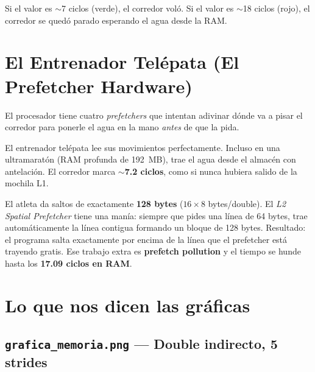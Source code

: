 \documentclass[12pt,a4paper]{article}
\begin{document}
\begin{tcolorbox}[clave, title={Interpretación del resultado}]
Si el valor es $\sim$7 ciclos \textcolor{verde}{(verde)}, el corredor voló. Si el valor es $\sim$18 ciclos \textcolor{rojo}{(rojo)}, el corredor se quedó parado esperando el agua desde la RAM.
\end{tcolorbox}

\section{El Entrenador Telépata (El Prefetcher Hardware)}
\label{sec:prefetcher}

El procesador tiene cuatro \emph{prefetchers} que intentan adivinar dónde va a pisar el corredor para ponerle el agua en la mano \emph{antes} de que la pida.

\begin{tcolorbox}[clave, title={Caso ideal: D=1, corredor predecible}]
El entrenador telépata lee sus movimientos perfectamente. Incluso en una ultramaratón (RAM profunda de 192~MB), trae el agua desde el almacén con antelación. El corredor marca \textbf{$\sim$7.2 ciclos}, como si nunca hubiera salido de la mochila L1.
\end{tcolorbox}

\begin{tcolorbox}[trampa, title={Caso peligroso: D=16, prefetch pollution}]
El atleta da saltos de exactamente \textbf{128 bytes} ($16 \times 8$ bytes/double). El \emph{L2 Spatial Prefetcher} tiene una manía: siempre que pides una línea de 64 bytes, trae automáticamente la línea contigua formando un bloque de 128 bytes. Resultado: el programa salta exactamente por encima de la línea que el prefetcher está trayendo gratis. Ese trabajo extra es \textbf{prefetch pollution} y el tiempo se hunde hasta los \textbf{17.09 ciclos en RAM}.
\end{tcolorbox}

\section{Lo que nos dicen las gráficas}
\label{sec:graficas}

\subsection{\texttt{grafica\_memoria.png} --- Double indirecto, 5 strides}
\end{document}
